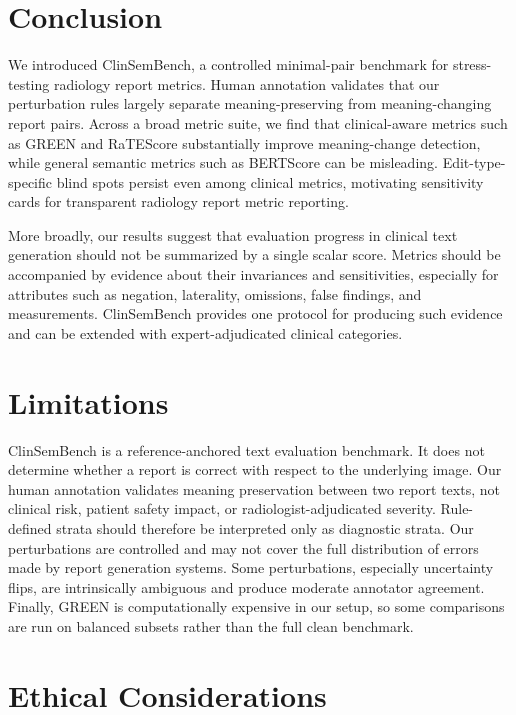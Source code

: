 \documentclass[11pt]{article}
\newcommand{\bench}{ClinSemBench\xspace}
\begin{document}
\section{Conclusion}

We introduced \bench, a controlled minimal-pair benchmark for stress-testing radiology report metrics. Human annotation validates that our perturbation rules largely separate meaning-preserving from meaning-changing report pairs. Across a broad metric suite, we find that clinical-aware metrics such as GREEN and RaTEScore substantially improve meaning-change detection, while general semantic metrics such as BERTScore can be misleading. Edit-type-specific blind spots persist even among clinical metrics, motivating sensitivity cards for transparent radiology report metric reporting.

More broadly, our results suggest that evaluation progress in clinical text generation should not be summarized by a single scalar score. Metrics should be accompanied by evidence about their invariances and sensitivities, especially for attributes such as negation, laterality, omissions, false findings, and measurements. \bench provides one protocol for producing such evidence and can be extended with expert-adjudicated clinical categories.

\section*{Limitations}

\bench is a reference-anchored text evaluation benchmark. It does not determine whether a report is correct with respect to the underlying image. Our human annotation validates meaning preservation between two report texts, not clinical risk, patient safety impact, or radiologist-adjudicated severity. Rule-defined strata should therefore be interpreted only as diagnostic strata. Our perturbations are controlled and may not cover the full distribution of errors made by report generation systems. Some perturbations, especially uncertainty flips, are intrinsically ambiguous and produce moderate annotator agreement. Finally, GREEN is computationally expensive in our setup, so some comparisons are run on balanced subsets rather than the full clean benchmark.

\section*{Ethical Considerations}
\end{document}
